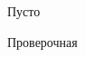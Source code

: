 \begin{class}[number=4]
	\begin{listofex}
		\item Пусто
	\end{listofex}
\end{class}


\begin{exam}
	\begin{listofex}
		\item Проверочная
	\end{listofex}
\end{exam}
